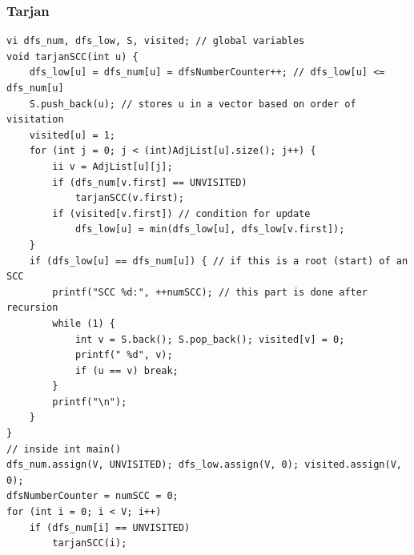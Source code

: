 \documentclass[8pt, a4paper, oneside, twocolumn]{extarticle}
\begin{document}
\subsubsection{Tarjan}
\begin{verbatim}
vi dfs_num, dfs_low, S, visited; // global variables
void tarjanSCC(int u) {
    dfs_low[u] = dfs_num[u] = dfsNumberCounter++; // dfs_low[u] <= dfs_num[u]
    S.push_back(u); // stores u in a vector based on order of visitation
    visited[u] = 1;
    for (int j = 0; j < (int)AdjList[u].size(); j++) {
        ii v = AdjList[u][j];
        if (dfs_num[v.first] == UNVISITED)
            tarjanSCC(v.first);
        if (visited[v.first]) // condition for update
            dfs_low[u] = min(dfs_low[u], dfs_low[v.first]); 
    }
    if (dfs_low[u] == dfs_num[u]) { // if this is a root (start) of an SCC
        printf("SCC %d:", ++numSCC); // this part is done after recursion
        while (1) {
            int v = S.back(); S.pop_back(); visited[v] = 0;
            printf(" %d", v);
            if (u == v) break; 
        }
        printf("\n");
    } 
}
// inside int main()
dfs_num.assign(V, UNVISITED); dfs_low.assign(V, 0); visited.assign(V, 0);
dfsNumberCounter = numSCC = 0;
for (int i = 0; i < V; i++)
    if (dfs_num[i] == UNVISITED)
        tarjanSCC(i);
\end{verbatim}
\end{document}
